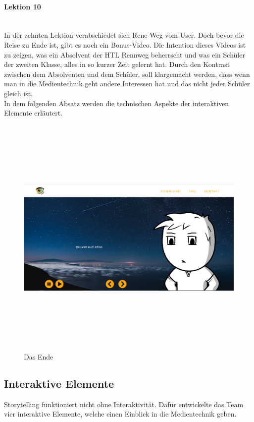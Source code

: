 \paragraph{Lektion 10} \leavevmode \\
In der zehnten Lektion verabschiedet sich Rene Weg vom User. Doch bevor die Reise zu Ende ist, gibt es noch ein Bonus-Video. Die Intention dieses Videos ist zu zeigen, was ein Absolvent der HTL Rennweg beherrscht und was ein Schüler der zweiten Klasse, alles in so kurzer Zeit gelernt hat. Durch den Kontrast zwischen dem Absolventen und dem Schüler, soll klargemacht werden, dass wenn man in die Medientechnik geht andere Interessen hat und das nicht jeder Schüler gleich ist. \leavevmode \\
In dem folgenden Absatz werden die technischen Aspekte der interaktiven Elemente erläutert.
\begin{figure} [h]
	\centering
\includegraphics[width=12cm,height=12cm,keepaspectratio]{webseite_abb21} 
	\caption{Das Ende}
\end{figure}
\subsection{Interaktive Elemente}
Storytelling funktioniert nicht ohne Interaktivität.  Dafür entwickelte das Team vier interaktive Elemente, welche einen Einblick in die Medientechnik geben. 
